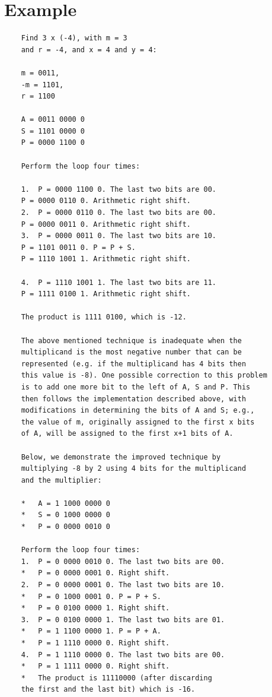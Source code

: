 \documentclass[10pt,a4paper]{article}
\begin{document}
\section{Example}
\lstset{}
\begin{lstlisting}
	Find 3 x (-4), with m = 3 
	and r = -4, and x = 4 and y = 4:     
	
	m = 0011, 
	-m = 1101,
	r = 1100
	
	A = 0011 0000 0 
	S = 1101 0000 0 
	P = 0000 1100 0 
	
	Perform the loop four times: 
	
	1.	P = 0000 1100 0. The last two bits are 00.  
	P = 0000 0110 0. Arithmetic right shift.  
	2.	P = 0000 0110 0. The last two bits are 00.  
	P = 0000 0011 0. Arithmetic right shift.  
	3.	P = 0000 0011 0. The last two bits are 10. 
	P = 1101 0011 0. P = P + S.  
	P = 1110 1001 1. Arithmetic right shift.  
	
	4.	P = 1110 1001 1. The last two bits are 11. 
	P = 1111 0100 1. Arithmetic right shift.  
	
	The product is 1111 0100, which is -12. 
	
	The above mentioned technique is inadequate when the
	multiplicand is the most negative number that can be 
	represented (e.g. if the multiplicand has 4 bits then
	this value is -8). One possible correction to this problem
	is to add one more bit to the left of A, S and P. This
	then follows the implementation described above, with 
	modifications in determining the bits of A and S; e.g., 
	the value of m, originally assigned to the first x bits 
	of A, will be assigned to the first x+1 bits of A. 
	
	Below, we demonstrate the improved technique by
	multiplying -8 by 2 using 4 bits for the multiplicand
	and the multiplier: 
	
	*	A = 1 1000 0000 0  
	*	S = 0 1000 0000 0  
	*	P = 0 0000 0010 0  
	
	Perform the loop four times: 
	1.	P = 0 0000 0010 0. The last two bits are 00.
	*   P = 0 0000 0001 0. Right shift.  
	2.	P = 0 0000 0001 0. The last two bits are 10.  
	*	P = 0 1000 0001 0. P = P + S.  
	*	P = 0 0100 0000 1. Right shift.  
	3.	P = 0 0100 0000 1. The last two bits are 01.  
	*	P = 1 1100 0000 1. P = P + A.  
	*	P = 1 1110 0000 0. Right shift.  
	4.	P = 1 1110 0000 0. The last two bits are 00.  
	*	P = 1 1111 0000 0. Right shift.  
	*	The product is 11110000 (after discarding 
	the first and the last bit) which is -16.  
	
\end{lstlisting}
\end{document}
